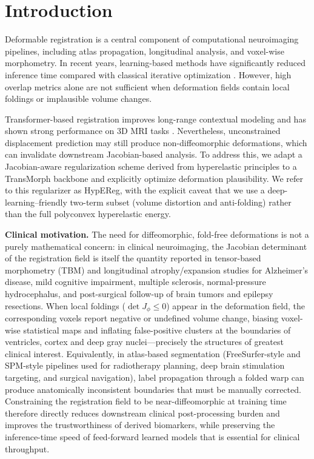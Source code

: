 \documentclass[jimaging,article,submit,pdftex,moreauthors]{Definitions/mdpi}
\begin{document}
\section{Introduction}

Deformable registration is a central component of computational neuroimaging pipelines, including atlas propagation, longitudinal analysis, and voxel-wise morphometry. In recent years, learning-based methods have significantly reduced inference time compared with classical iterative optimization \cite{balakrishnan2019voxelmorph,kim2021cyclemorph}. However, high overlap metrics alone are not sufficient when deformation fields contain local foldings or implausible volume changes.

Transformer-based registration improves long-range contextual modeling and has shown strong performance on 3D MRI tasks \cite{chen2022transmorph}. Nevertheless, unconstrained displacement prediction may still produce non-diffeomorphic deformations, which can invalidate downstream Jacobian-based analysis. To address this, we adapt a Jacobian-aware regularization scheme derived from hyperelastic principles \cite{burger2013hyperelastic} to a TransMorph backbone and explicitly optimize deformation plausibility. We refer to this regularizer as HypEReg, with the explicit caveat that we use a deep-learning--friendly two-term subset (volume distortion and anti-folding) rather than the full polyconvex hyperelastic energy.

\noindent\textbf{Clinical motivation.} The need for diffeomorphic, fold-free deformations is not a purely mathematical concern: in clinical neuroimaging, the Jacobian determinant of the registration field is itself the quantity reported in tensor-based morphometry (TBM) and longitudinal atrophy/expansion studies for Alzheimer's disease, mild cognitive impairment, multiple sclerosis, normal-pressure hydrocephalus, and post-surgical follow-up of brain tumors and epilepsy resections. When local foldings (\(\det J_\phi \le 0\)) appear in the deformation field, the corresponding voxels report negative or undefined volume change, biasing voxel-wise statistical maps and inflating false-positive clusters at the boundaries of ventricles, cortex and deep gray nuclei---precisely the structures of greatest clinical interest. Equivalently, in atlas-based segmentation (FreeSurfer-style and SPM-style pipelines used for radiotherapy planning, deep brain stimulation targeting, and surgical navigation), label propagation through a folded warp can produce anatomically inconsistent boundaries that must be manually corrected. Constraining the registration field to be near-diffeomorphic at training time therefore directly reduces downstream clinical post-processing burden and improves the trustworthiness of derived biomarkers, while preserving the inference-time speed of feed-forward learned models that is essential for clinical throughput.
\end{document}
